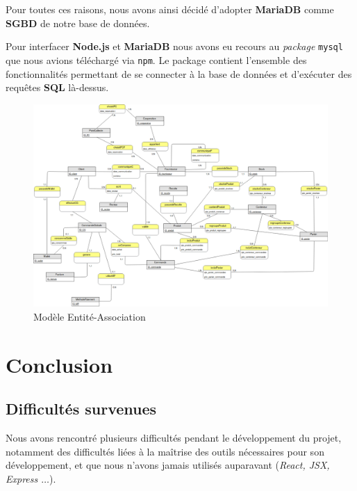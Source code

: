 \documentclass[a4paper,12pt]{report}
\theoremstyle{break}
\theoremstyle{break}
\theoremstyle{break}
\theoremstyle{break}
\theoremstyle{definition}
\theoremstyle{remark}
\begin{document}
Pour toutes ces raisons, nous avons ainsi décidé d'adopter \textbf{MariaDB} comme \textbf{SGBD} de notre base de données.

Pour interfacer \textbf{Node.js} et \textbf{MariaDB} nous avons eu recours au \textit{package} \og \texttt{mysql} \fg que nous avions téléchargé via \texttt{npm}. Le package contient l'ensemble des fonctionnalités permettant de se connecter à la base de données et d'exécuter des requêtes \textbf{SQL} là-dessus.

\begin{figure}[!ht]
  \centering
  \includegraphics[scale=0.35]{images/er_model.png}
  \caption{Modèle Entité-Association}
  \label{fig:modele_EA}
\end{figure}

\newpage
\chapter{Conclusion}
\section{Difficultés survenues}
Nous avons rencontré plusieurs difficultés pendant le développement du projet, notamment des difficultés liées à la maîtrise des outils nécessaires pour son développement, et que nous n'avons jamais utilisés auparavant (\textit{React, JSX, Express $\dots$}).
\end{document}
